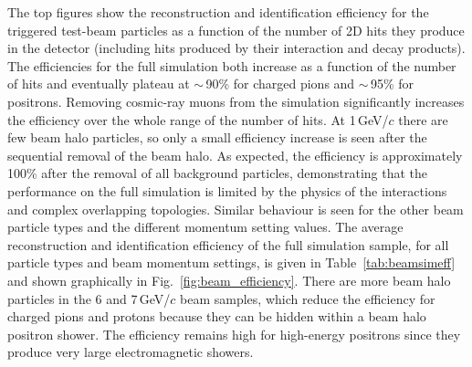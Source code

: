 \documentclass[epjc3]{svjour3}
\begin{document}
The top figures show the reconstruction and identification efficiency for the triggered test-beam particles as a function of the number of 2D hits they produce in the detector (including hits produced by their interaction and decay products). The efficiencies for the full simulation both increase as a function of the number of hits and eventually plateau at $\sim$\,90\% for charged pions and $\sim$\,95\% for positrons. Removing cosmic-ray muons from the simulation significantly increases the efficiency over the whole range of the number of hits. At 1\,GeV/$c$ there are few beam halo particles, so only a small efficiency increase is seen after the sequential removal of the beam halo. As expected, the efficiency is approximately 100\% after the removal of all background particles, demonstrating that the performance on the full simulation is limited by the physics of the interactions and complex overlapping topologies. Similar behaviour is seen for the other beam particle types and the different momentum setting values. The average reconstruction and identification efficiency of the full simulation sample, for all particle types and beam momentum settings, is given in Table~\ref{tab:beamsimeff} and shown graphically in Fig.~\ref{fig:beam_efficiency}. There are more beam halo particles in the 6 and 7\,GeV/$c$ beam samples, which reduce the efficiency for charged pions and protons because they can be hidden within a beam halo positron shower. The efficiency remains high for high-energy positrons since they produce very large electromagnetic showers. 
\end{document}
